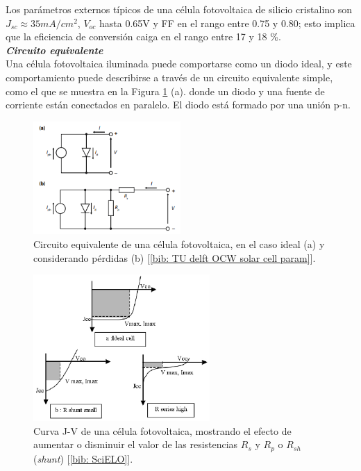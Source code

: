 \documentclass[12pt]{article}
\begin{document}
	\noindent Los parámetros externos típicos de una célula fotovoltaica de silicio cristalino son $J_{sc} \approx 35 mA/cm^2$, $V_{oc}$ hasta 0.65V y FF en el rango entre 0.75 y 0.80; esto implica que la eficiencia de conversión caiga en el rango entre 17 y 18 \%. \\
	
	\noindent \textit{\textbf{Circuito equivalente}} \\
	
	\noindent Una célula fotovoltaica iluminada puede comportarse como un diodo ideal, y este comportamiento puede describirse a través de un circuito equivalente simple, como el que se muestra en la Figura \ref{fig: equivalent circuit solar cell} (a). donde un diodo y una fuente de corriente están conectados en paralelo. El diodo está formado por una unión p-n. \\
	
	\begin{figure}[h!]
		\begin{center}
			\includegraphics[width=0.5\textwidth]{img/circuitEquivalent_solarCell.png}
			\caption{Circuito equivalente de una célula fotovoltaica, en el caso ideal (a) y considerando pérdidas (b) [\ref{bib: TU delft OCW solar cell param}].}
			\label{fig: equivalent circuit solar cell}
		\end{center}
	\end{figure}
	
	\pagebreak
	
	\begin{figure}[h!]
		\begin{center}
			\includegraphics[width=0.6\textwidth]{img/JV_curve_withRsRp.png}
			\caption{Curva J-V de una célula fotovoltaica, mostrando el efecto de aumentar o disminuir el valor de las resistencias $R_{s}$ y $R_{p}$ o $R_{sh}$ (\textit{shunt}) [\ref{bib: SciELO}].}
			\label{fig: JV curve with non-ideal model (one diode)}
		\end{center}
	\end{figure}
\end{document}
